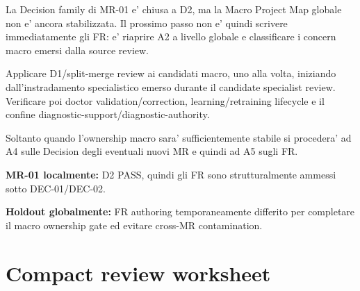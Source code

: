 \documentclass[11pt,a4paper]{article}
\begin{document}
La Decision family di MR-01 e' chiusa a D2, ma la Macro Project Map globale non e' ancora stabilizzata. Il prossimo passo non e' quindi scrivere immediatamente gli FR: e' riaprire A2 a livello globale e classificare i concern macro emersi dalla source review.

\begin{ddtaworking}[title={NEXT - Macro Project Map breadth review}]
Applicare D1/split-merge review ai candidati macro, uno alla volta, iniziando dall'instradamento specialistico emerso durante il candidate specialist review. Verificare poi doctor validation/correction, learning/retraining lifecycle e il confine diagnostic-support/diagnostic-authority.\par
Soltanto quando l'ownership macro sara' sufficientemente stabile si procedera' ad A4 sulle Decision degli eventuali nuovi MR e quindi ad A5 sugli FR.
\end{ddtaworking}

\begin{ddtaprinciple}[title={FR authorization status}]
\textbf{MR-01 localmente:} D2 PASS, quindi gli FR sono strutturalmente ammessi sotto DEC-01/DEC-02.\par
\textbf{Holdout globalmente:} FR authoring temporaneamente differito per completare il macro ownership gate ed evitare cross-MR contamination.
\end{ddtaprinciple}

\appendix
\section{Compact review worksheet}
\end{document}
